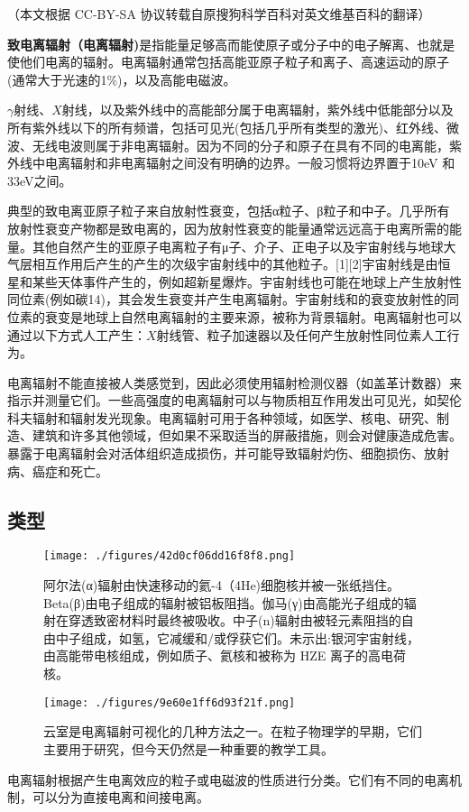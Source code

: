 
（本文根据 CC-BY-SA 协议转载自原搜狗科学百科对英文维基百科的翻译）

\textbf{致电离辐射（电离辐射)}是指能量足够高而能使原子或分子中的电子解离、也就是使他们电离的辐射。电离辐射通常包括高能亚原子粒子和离子、高速运动的原子(通常大于光速的1\%)，以及高能电磁波。

$\gamma$射线、$X$射线，以及紫外线中的高能部分属于电离辐射，紫外线中低能部分以及所有紫外线以下的所有频谱，包括可见光(包括几乎所有类型的激光)、红外线、微波、无线电波则属于非电离辐射。因为不同的分子和原子在具有不同的电离能，紫外线中电离辐射和非电离辐射之间没有明确的边界。一般习惯将边界置于10eV 和33eV之间。

典型的致电离亚原子粒子来自放射性衰变，包括α粒子、β粒子和中子。几乎所有放射性衰变产物都是致电离的，因为放射性衰变的能量通常远远高于电离所需的能量。其他自然产生的亚原子电离粒子有μ子、介子、正电子以及宇宙射线与地球大气层相互作用后产生的产生的次级宇宙射线中的其他粒子。[1][2]宇宙射线是由恒星和某些天体事件产生的，例如超新星爆炸。宇宙射线也可能在地球上产生放射性同位素(例如碳14)，其会发生衰变并产生电离辐射。宇宙射线和的衰变放射性的同位素的衰变是地球上自然电离辐射的主要来源，被称为背景辐射。电离辐射也可以通过以下方式人工产生：$X$射线管、粒子加速器以及任何产生放射性同位素人工行为。

电离辐射不能直接被人类感觉到，因此必须使用辐射检测仪器（如盖革计数器）来指示并测量它们。一些高强度的电离辐射可以与物质相互作用发出可见光，如契伦科夫辐射和辐射发光现象。电离辐射可用于各种领域，如医学、核电、研究、制造、建筑和许多其他领域，但如果不采取适当的屏蔽措施，则会对健康造成危害。暴露于电离辐射会对活体组织造成损伤，并可能导致辐射灼伤、细胞损伤、放射病、癌症和死亡。

\subsection{类型}
\begin{figure}[ht]
\centering
\texttt{[image: ./figures/42d0cf06dd16f8f8.png]}
\caption{阿尔法(α)辐射由快速移动的氦-4（4He)细胞核并被一张纸挡住。Beta(β)由电子组成的辐射被铝板阻挡。伽马(γ)由高能光子组成的辐射在穿透致密材料时最终被吸收。中子(n)辐射由被轻元素阻挡的自由中子组成，如氢，它减缓和/或俘获它们。未示出:银河宇宙射线，由高能带电核组成，例如质子、氦核和被称为 HZE 离子的高电荷核。} \label{fig_DLFS_1}
\end{figure}
\begin{figure}[ht]
\centering
\texttt{[image: ./figures/9e60e1ff6d93f21f.png]}
\caption{云室是电离辐射可视化的几种方法之一。在粒子物理学的早期，它们主要用于研究，但今天仍然是一种重要的教学工具。} \label{fig_DLFS_2}
\end{figure}
电离辐射根据产生电离效应的粒子或电磁波的性质进行分类。它们有不同的电离机制，可以分为直接电离和间接电离。

